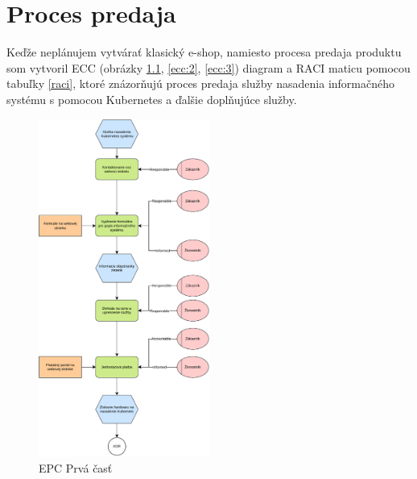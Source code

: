 \chapter{Proces predaja}

Keďže neplánujem vytvárať klasický e-shop, namiesto procesa predaja produktu som vytvoril ECC (obrázky \ref{ecc:1}, \ref{ecc:2}, \ref{ecc:3}) diagram a RACI maticu pomocou tabuľky \ref{raci}, ktoré znázorňujú proces predaja služby nasadenia informačného systému s pomocou Kubernetes a ďalšie doplňujúce služby.


\begin{figure}[htbp]
  \centering
  \includegraphics[width=0.5\textwidth]{images/EPC_1.pdf}
  \caption{EPC Prvá časť}
  \label{ecc:1}
\end{figure}

